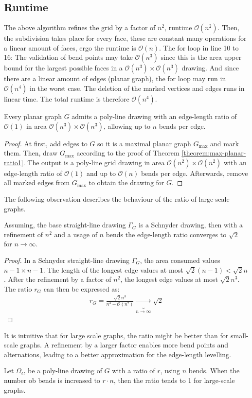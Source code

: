 \subsection{Runtime}
The above algorithm refines the grid by a factor of $n^2$, runtime $\mathcal{O}(n^2)$. Then, the subdivision takes place for every face, these are constant many operations for a linear amount of faces, ergo the runtime is $\mathcal{O}(n)$. The for loop in line 10 to 16: The validation of bend points may take $\mathcal{O}(n^3)$ since this is the area upper bound for the largest possible faces in a $\mathcal{O}(n^3)\times\mathcal{O}(n^3)$ drawing. And since there are a linear amount of edges (planar graph), the for loop may run in $\mathcal{O}(n^4)$ in the worst case. The deletion of the marked vertices and edges runs in linear time. The total runtime is therefore $\mathcal{O}(n^4)$.
\begin{theorem}
\end{theorem}
Every planar graph $G$ admits a poly-line drawing with an edge-length ratio of $\mathcal{O}(1)$ in area $\mathcal{O}(n^3)\times \mathcal{O}(n^3)$, allowing up to $n$ bends per edge.
\begin{proof}
	At first, add edges to $G$ so it is a maximal planar graph $G_{\max}$ and mark them. Then, draw $G_{\max}$ according to the proof of Theorem \ref{theorem:max-planar-ratio1}. The output is a poly-line grid drawing in area $\mathcal{O}(n^2)\times \mathcal{O}(n^2)$ with an edge-length ratio of $\mathcal{O}(1)$ and up to $\mathcal{O}(n)$ bends per edge. Afterwards, remove all marked edges from $G_{\max}$ to obtain the drawing for $G$.
\end{proof}

The following observation describes the behaviour of the ratio of large-scale graphs.
\begin{observation}
\end{observation}
Assuming, the base straight-line drawing $\Gamma_G$ is a Schnyder drawing, then with a refinement of $n^2$ and a usage of $n$ bends the edge-length ratio converges to $\sqrt{2}$ for $n \to \infty$.
\begin{proof}
	In a Schnyder straight-line drawing $\Gamma_G$, the area consumed values $n-1\times n-1$. The length of the longest edge values at most $\sqrt{2}(n-1) < \sqrt{2}n$. After the refinement by a factor of $n^2$, the longest edge values at most $\sqrt{2}n^3$. The ratio $r_G$ can then be expressed as:
	\begin{align*}
		r_G = \frac{\sqrt{2}n^3}{n^3-\mathcal{O}(n^2)} \underbrace{\rightarrow}_{n\to\infty} \sqrt{2}
	\end{align*}
\end{proof}
It is intuitive that for large scale graphs, the ratio might be better than for small-scale graphs. A refinement by a larger factor enables more bend points and alternations, leading to a better approximation for the edge-length levelling.
\begin{observation}
\end{observation}
Let $\Omega_G$ be a poly-line drawing of $G$ with a ratio of $r$, using $n$ bends. When the number ob bends is increased to $r\cdot n$, then the ratio tends to 1 for large-scale graphs.

